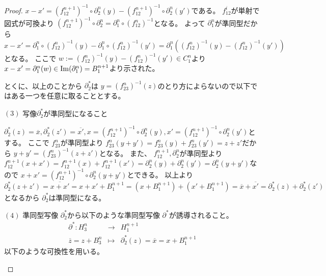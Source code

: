 \documentclass[dvipdfmx]{jsarticle}
\begin{document}
\begin{proof}
  $x - x' = (f_{12}^{n+1})^{-1} \circ \partial^n_2(y) - (f_{12}^{n+1})^{-1} \circ \partial^n_2(y')$である。
  $f_{12}^i$が単射で図式が可換より $(f_{12}^{n+1})^{-1} \circ \partial^n_2 = \partial^n_1 \circ (f_{12}^n)^{-1}$となる。
  よって $\partial^n_1$が準同型だから $x - x' = \partial^n_1 \circ (f_{12}^n)^{-1}(y) - \partial^n_1 \circ (f_{12}^n)^{-1}(y') = \partial^n_1((f_{12}^n)^{-1}(y) - (f_{12}^n)^{-1}(y'))$となる。
  ここで $w := (f_{12}^n)^{-1}(y) - (f_{12}^n)^{-1}(y') \in C^n_1$より
  $x - x' = \partial^n_1(w) \in \mathop{\mathrm{Im}}\nolimits(\partial^n_1) = B^{n+1}_1$より示された。

  とくに、以上のことから $\partial^*_2$は $y = (f_{23}^n)^{-1}(z)$のとり方によらないので以下ではある一つを任意に取ることとする。

  $(3)$
  写像$\partial^*_2$が準同型になること

  $\partial^*_2(z) = \overline{x} , \partial^*_2(z') = \overline{x'} , x = (f_{12}^{n+1})^{-1} \circ \partial^n_2(y) , x' = (f_{12}^{n+1})^{-1} \circ \partial^n_2(y')$とする。
  ここで $f_{23}^n$が準同型より
  $f_{23}^n(y + y') = f_{23}^n(y) + f_{23}^n(y') = z + z'$だから
  $y + y' = (f_{23}^n)^{-1}(z + z')$となる。
  また、 $f_{12}^{n+1} , \partial^n_2$が準同型より
  $f_{12}^{n+1}(x + x') = f_{12}^{n+1}(x) + f_{12}^{n+1}(x') = \partial^n_2(y) + \partial^n_2(y') = \partial^n_2(y + y')$なので
  $x + x' = (f_{12}^{n+1})^{-1} \circ \partial^n_2(y + y')$とできる。
  以上より $\partial^*_2(z + z') = \overline{x + x'} = x + x' + B^{n+1}_1 = (x + B^{n+1}_1) + (x' + B^{n+1}_1) = \overline{x} + \overline{x'} = \partial^*_2(z) + \partial^*_2(z')$となるから $\partial^*_2$は準同型になる。

  $(4)$
  準同型写像 $\partial^*_2$から以下のような準同型写像 $\partial^*$が誘導されること。
  \begin{eqnarray*}
    \partial^* : H^n_3 & \longrightarrow & H^{n+1}_1 \\
    \overline{z} = z + B^n_3 & \longmapsto & \partial^*_2(z) = \overline{x} = x + B^{n+1}_1
  \end{eqnarray*}
  以下のような可換性を用いる。
  \begin{center}
\end{center}
\end{proof}
\end{document}
